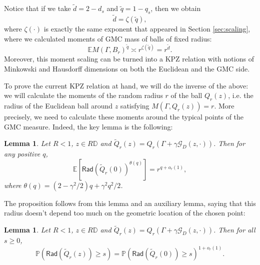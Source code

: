 \documentclass[11pt]{amsart}
\newtheorem{lemma}[thm]{Lemma}
\newcommand{\G}{\mathcal G}
\newcommand{\D}{\mathbb D}
\newcommand{\E}{\mathbb E}
\renewcommand{\P}{\mathbb P}
\renewcommand{\1}{\mathbf 1}
\newcommand{\radS}{\mathsf{Rad}}
\begin{document}
Notice that if we take $\tilde d = 2 - d_s$ and $\tilde q = 1 - q_s$, then we obtain 
$$\tilde d = \zeta(\tilde q),$$
where $\zeta(\cdot)$ is exactly the same exponent that appeared in Section \ref{sec:scaling}, where we calculated moments of GMC mass of balls of fixed radius:
$$\E M(\Gamma,B_r)^{\tilde q} \asymp r^{\zeta(\tilde q)} = r^{\tilde d}.$$
Moreover, this moment scaling can be turned into a KPZ relation with notions of Minkowski and Hausdorff dimensions on both the Euclidean and the GMC side.

To prove the current KPZ relation at hand, we will do the inverse of the above: we will calculate the moments of the random radius $r$ of the ball $Q_r(z)$, i.e. the radius of the Euclidean ball around $z$ satisfying $M(\Gamma, Q_r(z)) = r$. More precisely, we need to calculate these moments around the typical points of the GMC measure. Indeed, the key lemma is the following:

\begin{lemma}\label{lem:KPZ}
Let $R<1$, $z \in R\D$ and $\tilde Q_r(z) = Q_r(\Gamma + \gamma \G_D(z,\cdot))$. Then
for any positive $q$, $$\E \left[\radS(\tilde Q_r(0))^{\theta(q)}\right] = r^{q+o_r(1)},$$ where $\theta(q) = (2-\gamma^2/2)q + \gamma^2q^2/2$.
\end{lemma}

The proposition follows from this lemma and an auxiliary lemma, saying that this radius doesn't depend too much on the geometric location of the chosen point:
\begin{lemma}\label{lem:KPZaux}
Let $R<1$, $z \in R\D$ and $\tilde Q_r(z) = Q_r(\Gamma + \gamma \G_D(z,\cdot))$. Then for all $s \geq 0$, $$\P\left(\radS(\tilde Q_r(z)) \geq s\right) = \P\left(\radS(\tilde Q_r(0)) \geq s\right)^{1+o_r(1)}.$$
\end{lemma}
\end{document}
